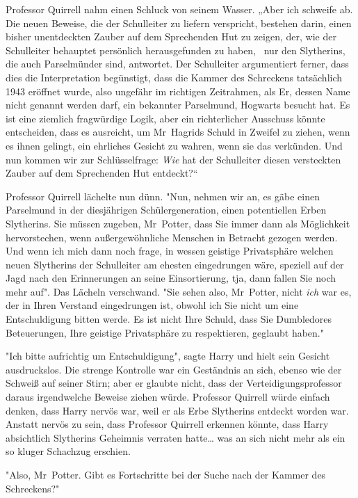 {Professor Quirrell nahm einen Schluck von seinem Wasser. „Aber ich schweife ab. Die neuen Beweise, die der Schulleiter zu liefern verspricht, bestehen darin, einen bisher unentdeckten Zauber auf dem Sprechenden Hut zu zeigen, der, wie der Schulleiter behauptet persönlich herausgefunden zu haben, ~nur den Slytherins, die auch Parselmünder sind, antwortet. Der Schulleiter argumentiert ferner, dass dies die Interpretation begünstigt, dass die Kammer des Schreckens tatsächlich 1943 eröffnet wurde, also ungefähr im richtigen Zeitrahmen, als Er, dessen Name nicht genannt werden darf, ein bekannter Parselmund, Hogwarts besucht hat. Es ist eine ziemlich fragwürdige Logik, aber ein richterlicher Ausschuss könnte entscheiden, dass es ausreicht, um Mr~Hagrids Schuld in Zweifel zu ziehen, wenn es ihnen gelingt, ein ehrliches Gesicht zu wahren, wenn sie das verkünden. Und nun kommen wir zur Schlüsselfrage: \emph{Wie} hat der Schulleiter diesen versteckten Zauber auf dem Sprechenden Hut entdeckt?“

Professor Quirrell lächelte nun dünn. "Nun, nehmen wir an, es gäbe einen Parselmund in der diesjährigen Schülergeneration, einen potentiellen Erben Slytherins. Sie müssen zugeben, Mr~Potter, dass Sie immer dann als Möglichkeit hervorstechen, wenn außergewöhnliche Menschen in Betracht gezogen werden. Und wenn ich mich dann noch frage, in wessen geistige Privatsphäre welchen neuen Slytherins der Schulleiter am ehesten eingedrungen wäre, speziell auf der Jagd nach den Erinnerungen an seine Einsortierung, tja, dann fallen Sie noch mehr auf". Das Lächeln verschwand. "Sie sehen also, Mr~Potter, nicht \emph{ich} war es, der in Ihren Verstand eingedrungen ist, obwohl ich Sie nicht um eine Entschuldigung bitten werde. Es ist nicht Ihre Schuld, dass Sie Dumbledores Beteuerungen, Ihre geistige Privatsphäre zu respektieren, geglaubt haben."

"Ich bitte aufrichtig um Entschuldigung", sagte Harry und hielt sein Gesicht ausdruckslos. Die strenge Kontrolle war ein Geständnis an sich, ebenso wie der Schweiß auf seiner Stirn; aber er glaubte nicht, dass der Verteidigungsprofessor daraus irgendwelche Beweise ziehen würde. Professor Quirrell würde einfach denken, dass Harry nervös war, weil er als Erbe Slytherins entdeckt worden war. Anstatt nervös zu sein, dass Professor Quirrell erkennen könnte, dass Harry absichtlich Slytherins Geheimnis verraten hatte… was an sich nicht mehr als ein so kluger Schachzug erschien.

"Also, Mr~Potter. Gibt es Fortschritte bei der Suche nach der Kammer des Schreckens?"

}
